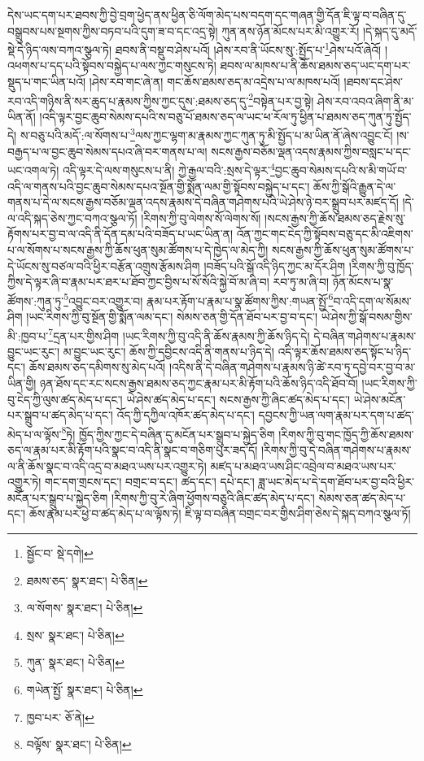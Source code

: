 དེས་ཡང་དག་པར་ཐབས་ཀྱི་བྱེ་བྲག་ཕྱེད་ནས་ཕྱིན་ཅི་ལོག་མེད་པས་བདག་དང་གཞན་གྱི་དོན་ཇི་ལྟ་བ་བཞིན་དུ་བསྒྲུབས་པས་སྔགས་ཀྱིས་བཏབ་པའི་དུག་ཟ་བ་དང་འདྲ་སྟེ། ཀུན་ནས་ཉོན་མོངས་པར་མི་འགྱུར་རོ། །དེ་སྐད་དུ་མདོ་སྡེ་དེ་ཉིད་ལས་བཀའ་སྩལ་ཏེ། ཐབས་ནི་བསྡུ་བ་ཤེས་པའོ། །ཤེས་རབ་ནི་ཡོངས་སུ་:སྤྱོད་པ་\footnote{སྦྱོང་བ་  སྡེ་དགེ། }ཤེས་པའོ་ཞེའོ། །འཕགས་པ་དད་པའི་སྟོབས་བསྐྱེད་པ་ལས་ཀྱང་གསུངས་ཏེ། ཐབས་ལ་མཁས་པ་ནི་ཆོས་ཐམས་ཅད་ཡང་དག་པར་སྡུད་པ་གང་ཡིན་པའོ། །ཤེས་རབ་གང་ཞེ་ན། གང་ཆོས་ཐམས་ཅད་མ་འདྲེས་པ་ལ་མཁས་པའོ། །ཐབས་དང་ཤེས་རབ་འདི་གཉིས་ནི་སར་ཆུད་པ་རྣམས་ཀྱིས་ཀྱང་དུས་:ཐམས་ཅད་དུ་\footnote{ཐམས་ཅད་  སྣར་ཐང་།  པེ་ཅིན། }བསྟེན་པར་བྱ་སྟེ། ཤེས་རབ་འབའ་ཞིག་ནི་མ་ཡིན་ནོ། །འདི་ལྟར་བྱང་ཆུབ་སེམས་དཔའི་ས་བཅུ་པོ་ཐམས་ཅད་ལ་ཡང་ཕ་རོལ་ཏུ་ཕྱིན་པ་ཐམས་ཅད་ཀུན་ཏུ་སྤྱོད་དེ། ས་བཅུ་པའི་མདོ་:ལ་སོགས་པ་\footnote{ལ་སོགས་  སྣར་ཐང་།  པེ་ཅིན། }ལས་ཀྱང་ལྷག་མ་རྣམས་ཀྱང་ཀུན་ཏུ་མི་སྤྱོད་པ་མ་ཡིན་ནོ་ཞེས་འབྱུང་ངོ། །ས་བརྒྱད་པ་ལ་བྱང་ཆུབ་སེམས་དཔའ་ཞི་བར་གནས་པ་ལ། སངས་རྒྱས་བཅོམ་ལྡན་འདས་རྣམས་ཀྱིས་བསླང་པ་དང་ཡང་འགལ་ཏེ། འདི་ལྟར་དེ་ལས་གསུངས་པ་ནི། ཀྱེ་རྒྱལ་བའི་:སྲས་དེ་ལྟར་\footnote{སྲས་  སྣར་ཐང་།  པེ་ཅིན། }བྱང་ཆུབ་སེམས་དཔའི་ས་མི་གཡོ་བ་འདི་ལ་གནས་པའི་བྱང་ཆུབ་སེམས་དཔའ་སྔོན་གྱི་སྨོན་ལམ་གྱི་སྟོབས་བསྐྱེད་པ་དང་། ཆོས་ཀྱི་སྒོའི་རྒྱུན་དེ་ལ་གནས་པ་དེ་ལ་སངས་རྒྱས་བཅོམ་ལྡན་འདས་རྣམས་དེ་བཞིན་གཤེགས་པའི་ཡེ་ཤེས་ཉེ་བར་སྒྲུབ་པར་མཛད་དོ། །དེ་ལ་འདི་སྐད་ཅེས་ཀྱང་བཀའ་སྩལ་ཏོ། །རིགས་ཀྱི་བུ་ལེགས་སོ་ལེགས་སོ། །སངས་རྒྱས་ཀྱི་ཆོས་ཐམས་ཅད་རྗེས་སུ་རྟོགས་པར་བྱ་བ་ལ་འདི་ནི་དོན་དམ་པའི་བཟོད་པ་ཡང་ཡིན་ན། འོན་ཀྱང་གང་ངེད་ཀྱི་སྟོབས་བཅུ་དང་མི་འཇིགས་པ་ལ་སོགས་པ་སངས་རྒྱས་ཀྱི་ཆོས་ཕུན་སུམ་ཚོགས་པ་དེ་ཁྱེད་ལ་མེད་ཀྱི། སངས་རྒྱས་ཀྱི་ཆོས་ཕུན་སུམ་ཚོགས་པ་དེ་ཡོངས་སུ་བཙལ་བའི་ཕྱིར་བརྩོན་འགྲུས་རྩོམས་ཤིག །བཟོད་པའི་སྒོ་འདི་ཉིད་ཀྱང་མ་དོར་ཤིག །རིགས་ཀྱི་བུ་ཁྱོད་ཀྱིས་དེ་ལྟར་ཞི་བ་རྣམ་པར་ཐར་པ་ཐོབ་ཀྱང་བྱིས་པ་སོ་སོའི་སྐྱེ་བོ་མ་ཞི་བ། རབ་ཏུ་མ་ཞི་བ། ཉོན་མོངས་པ་སྣ་ཚོགས་:ཀུན་ཏུ་\footnote{ཀུན་  སྣར་ཐང་།  པེ་ཅིན། }འབྱུང་བར་འགྱུར་བ། རྣམ་པར་རྟོག་པ་རྣམ་པ་སྣ་ཚོགས་ཀྱིས་:གཡན་སྤྱོ་\footnote{གཡེན་སྤྱོ་  སྣར་ཐང་།  པེ་ཅིན། }བ་འདི་དག་ལ་སོམས་ཤིག །ཡང་རིགས་ཀྱི་བུ་སྔོན་གྱི་སྨོན་ལམ་དང་། སེམས་ཅན་གྱི་དོན་ཐོབ་པར་བྱ་བ་དང་། ཡེ་ཤེས་ཀྱི་སྒོ་བསམ་གྱིས་མི་:ཁྱབ་པ་\footnote{ཁྱབ་པར་  ཅོ་ནེ། }དྲན་པར་གྱིས་ཤིག །ཡང་རིགས་ཀྱི་བུ་འདི་ནི་ཆོས་རྣམས་ཀྱི་ཆོས་ཉིད་དེ། དེ་བཞིན་གཤེགས་པ་རྣམས་བྱུང་ཡང་རུང་། མ་བྱུང་ཡང་རུང་། ཆོས་ཀྱི་དབྱིངས་འདི་ནི་གནས་པ་ཉིད་དེ། འདི་ལྟར་ཆོས་ཐམས་ཅད་སྟོང་པ་ཉིད་དང་། ཆོས་ཐམས་ཅད་དམིགས་སུ་མེད་པའོ། །འདིས་ནི་དེ་བཞིན་གཤེགས་པ་རྣམས་ཉི་ཚེ་རབ་ཏུ་དབྱེ་བར་བྱ་བ་མ་ཡིན་གྱི། ཉན་ཐོས་དང་རང་སངས་རྒྱས་ཐམས་ཅད་ཀྱང་རྣམ་པར་མི་རྟོག་པའི་ཆོས་ཉིད་འདི་ཐོབ་བོ། །ཡང་རིགས་ཀྱི་བུ་ངེད་ཀྱི་ལུས་ཚད་མེད་པ་དང་། ཡེ་ཤེས་ཚད་མེད་པ་དང་། སངས་རྒྱས་ཀྱི་ཞིང་ཚད་མེད་པ་དང་། ཡེ་ཤེས་མངོན་པར་སྒྲུབ་པ་ཚད་མེད་པ་དང་། འོད་ཀྱི་དཀྱིལ་འཁོར་ཚད་མེད་པ་དང་། དབྱངས་ཀྱི་ཡན་ལག་རྣམ་པར་དག་པ་ཚད་མེད་པ་ལ་ལྟོས་\footnote{བལྟོས་  སྣར་ཐང་།  པེ་ཅིན། }ཏེ། ཁྱོད་ཀྱིས་ཀྱང་དེ་བཞིན་དུ་མངོན་པར་སྒྲུབ་པ་སྐྱེད་ཅིག །རིགས་ཀྱི་བུ་གང་ཁྱོད་ཀྱི་ཆོས་ཐམས་ཅད་ལ་རྣམ་པར་མི་རྟོག་པའི་སྣང་བ་འདི་ནི་སྣང་བ་གཅིག་པུར་ཟད་དོ། །རིགས་ཀྱི་བུ་དེ་བཞིན་གཤེགས་པ་རྣམས་ལ་ནི་ཆོས་སྣང་བ་འདི་འདྲ་བ་མཐའ་ཡས་པར་འགྱུར་ཏེ། མཛད་པ་མཐའ་ཡས་ཤིང་འབྲེལ་བ་མཐའ་ཡས་པར་འགྱུར་ཏེ། གང་དག་གྲངས་དང་། བགྲང་བ་དང་། ཚད་དང་། དཔེ་དང་། ཟླ་ཡང་མེད་པ་དེ་དག་ཐོབ་པར་བྱ་བའི་ཕྱིར་མངོན་པར་སྒྲུབ་པ་སྐྱེད་ཅིག །རིགས་ཀྱི་བུ་རེ་ཞིག་ཕྱོགས་བཅུའི་ཞིང་ཚད་མེད་པ་དང་། སེམས་ཅན་ཚད་མེད་པ་དང་། ཆོས་རྣམ་པར་ཕྱེ་བ་ཚད་མེད་པ་ལ་ལྟོས་ཏེ། ཇི་ལྟ་བ་བཞིན་བགྲང་བར་གྱིས་ཤིག་ཅེས་དེ་སྐད་བཀའ་སྩལ་ཏོ། 